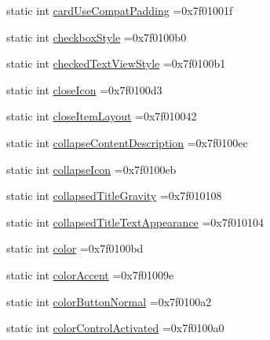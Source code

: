 \begin{DoxyCompactItemize}
\item 
static int \hyperlink{classandroid_1_1support_1_1graphics_1_1drawable_1_1animated_1_1R_1_1attr_a2bf8c5a638e1b1f4dbc8465d38ce1450}{card\+Use\+Compat\+Padding} =0x7f01001f
\item 
static int \hyperlink{classandroid_1_1support_1_1graphics_1_1drawable_1_1animated_1_1R_1_1attr_ab8fb810799cfc9a323ef0366a87bfdab}{checkbox\+Style} =0x7f0100b0
\item 
static int \hyperlink{classandroid_1_1support_1_1graphics_1_1drawable_1_1animated_1_1R_1_1attr_aec4465739d15e3c29a19c9c39eaa8952}{checked\+Text\+View\+Style} =0x7f0100b1
\item 
static int \hyperlink{classandroid_1_1support_1_1graphics_1_1drawable_1_1animated_1_1R_1_1attr_aa7a68c67919b520f99558a5cf7bc3874}{close\+Icon} =0x7f0100d3
\item 
static int \hyperlink{classandroid_1_1support_1_1graphics_1_1drawable_1_1animated_1_1R_1_1attr_a927c3234089c908fb419947bbcec2f1d}{close\+Item\+Layout} =0x7f010042
\item 
static int \hyperlink{classandroid_1_1support_1_1graphics_1_1drawable_1_1animated_1_1R_1_1attr_a28e3f6c55f0becc3dc9bed828ec2de8c}{collapse\+Content\+Description} =0x7f0100ec
\item 
static int \hyperlink{classandroid_1_1support_1_1graphics_1_1drawable_1_1animated_1_1R_1_1attr_a0fcc55024c49201a4067853f24c51f85}{collapse\+Icon} =0x7f0100eb
\item 
static int \hyperlink{classandroid_1_1support_1_1graphics_1_1drawable_1_1animated_1_1R_1_1attr_aeb131496f92cb91ec384e07be37901ee}{collapsed\+Title\+Gravity} =0x7f010108
\item 
static int \hyperlink{classandroid_1_1support_1_1graphics_1_1drawable_1_1animated_1_1R_1_1attr_a50a6c0d4ffb0e64609b354725f1a8fe3}{collapsed\+Title\+Text\+Appearance} =0x7f010104
\item 
static int \hyperlink{classandroid_1_1support_1_1graphics_1_1drawable_1_1animated_1_1R_1_1attr_a1d57c156fe8a7b2edea82f71d9305738}{color} =0x7f0100bd
\item 
static int \hyperlink{classandroid_1_1support_1_1graphics_1_1drawable_1_1animated_1_1R_1_1attr_a3323c52db513658650279a6644221f04}{color\+Accent} =0x7f01009e
\item 
static int \hyperlink{classandroid_1_1support_1_1graphics_1_1drawable_1_1animated_1_1R_1_1attr_a2c2682599083668662dd93ec8e0b2240}{color\+Button\+Normal} =0x7f0100a2
\item 
static int \hyperlink{classandroid_1_1support_1_1graphics_1_1drawable_1_1animated_1_1R_1_1attr_aaf4ee1c60b7a2eea360943b07ee08f64}{color\+Control\+Activated} =0x7f0100a0

\end{DoxyCompactItemize}
